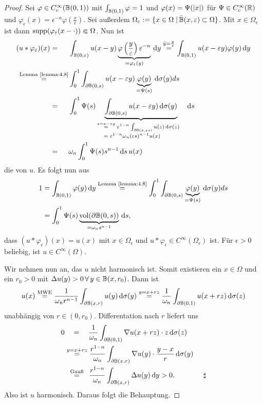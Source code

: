 \begin{proof}
  Sei $\varphi\in C_c^\infty(\mathbb{B}(0,1))$ mit $\int_{\mathbb{B}(0,1)}\varphi=1$ und $\varphi(x)=\Psi(\lvert x\rvert)$ für $\Psi\in C_c^\infty(\mathbb{R})$ und $\varphi_\epsilon(x)=\epsilon^{-n}\varphi\left(\frac x\epsilon\right)$. Sei außerdem $\Omega_\varepsilon:=\{x\in\Omega\;\vert\,\bar{\mathbb{B}}(x,\varepsilon)\subset\Omega\}$. Mit $x\in\Omega_\epsilon$ ist dann $\operatorname{supp}(\varphi_\varepsilon(x-\cdot{}))\Subset\Omega$. Nun ist
\[
\begin{split}
  (u\ast \varphi_\epsilon)(x) = \quad \, \ &\int_{\B(0,\epsilon)}u(x-y) \underbrace{\varphi \left(\frac y\epsilon\right)\epsilon^{-n}}_{= \varphi_\epsilon (y)} \d y 
    \overset{\bar y=\frac y\epsilon}=\int_{\B(0,1)}u(x-\epsilon y)\varphi(y)\d y \\
    \overset{\scriptsize\text{Lemma~\ref{lemma:4.8}}}= &\int_0^1\int_{\partial\B(0,s)}u(x-\epsilon y)\underbrace{\varphi(y)}_{=\Psi(s)}\d\sigma(y)ds \\
    = \quad \, \ &\int_0^1\Psi(s)\underbrace{\int_{\partial \B(0,s)}u(x-\epsilon y)\d\sigma(y)}_{\parbox{4.3cm}{\scriptsize$\overset{z=x-\epsilon y} 
        =\epsilon^{1-n}\int_{\partial\B(x,\epsilon s)}u(z)\d\sigma(z)$ \\
       \text{ }  \text{ }\,$ =\epsilon^{1-n}\omega_n(\epsilon s)^{n-1}u(x)
    $}} \d s \\
    = \quad \, \ &\omega_n\int_0^1\Psi(s)s^{n-1}\d s \, u(x)
\end{split}
\]
die  von $u$. Es folgt nun aus
\[
\begin{split}
  1&=\int_{\mathbb{B}(0,1)}\varphi(y)\,\mathrm{d} y\overset{\scriptsize\text{Lemma~\ref{lemma:4.8}}}
  =\int_0^1\int_{\partial\mathbb{B}(0,s)}\underbrace{\varphi(y)}_{=\Psi(s)}\,\mathrm{d}\sigma(y)ds \\
  &=\int_0^1\Psi(s)\underbrace{\operatorname{vol}(\partial\mathbb{B}(0,s))}_{=\omega_ns^{n-1}}\,\mathrm{d} s,
\end{split}
\] 
dass $(u\ast\varphi_\epsilon)(x)=u(x)$ mit $x\in\Omega_\epsilon$ und $u\ast\varphi_\epsilon\in C^\infty(\Omega_\epsilon)$ ist. Für $\epsilon>0$ beliebig, ist $u\in C^\infty(\Omega)$.

Wir nehmen nun an, das $u$ nicht harmonisch ist. Somit existieren ein $x\in\Omega$ und ein $r_0>0$ mit $\Delta u(y)>0 \,  \forall \, y\in\mathbb{B}(x,r_0)$. Dann ist
\[
u(x)\overset{\scriptsize\text{MWE}}=\frac 1{\omega_n r^{n-1}}\int_{\partial\mathbb{B}(x,r)}u(y)\,\mathrm{d}\sigma(y)\overset{y=x+rz}=\frac 1{\omega_n}\int_{\partial\mathbb{B}(0,1)}u(x+rz)\,\mathrm{d}\sigma(z)
\]
unabhängig von $r\in(0,r_0)$. Differentation nach $r$ liefert uns
\[
\begin{split}
  0&\quad=\quad \frac 1{\omega_n}\int_{\partial\mathbb{B}(0,1)}\nabla u(x+rz)\cdot
  z\,\mathrm{d}\sigma(z) \\
  &\overset{y=x+rz}= \frac{r^{1-n}}{\omega_n}\int_{\partial\mathbb{B}(x,r)}\nabla
  u(y)\cdot\frac{y-x}{r}\,\mathrm{d}\sigma(y) \\
  &\ \, \overset{\scriptsize\text{Gauß}}= \ \, \frac{r^{1-n}}{\omega_n}\int_{\partial\mathbb{B}(x,r)}\Delta u(y)\,\mathrm{d} y>0. \qquad\qquad \sharp
\end{split}
\]
Also ist $u$ harmonisch. Daraus folgt die Behauptung.
\end{proof}

